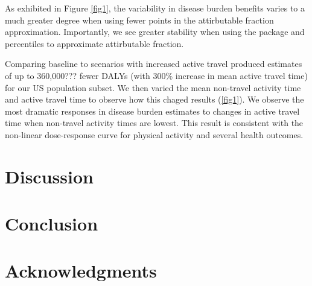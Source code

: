 \documentclass[10pt,letterpaper]{article}\usepackage[]{graphicx}\usepackage[]{color}
\begin{document}
As exhibited in Figure \ref{fig1}, the variability in disease burden
benefits varies to a much greater degree when using fewer points in
the attirbutable fraction approximation. Importantly, we see greater
stability when using the package and percentiles to approximate
attirbutable fraction.

Comparing baseline to scenarios with increased active travel produced
estimates of up to 360,000??? fewer DALYs (with 300\% increase in mean
active travel time) for our US population subset. We then varied the
mean non-travel activity time and active travel time to observe how
this chaged results (\ref{fig1}). We observe the most dramatic
responses in disease burden estimates to changes in active travel time
when non-travel activity times are lowest. This result is consistent
with the non-linear dose-response curve for physical activity and
several health outcomes.

%

\section*{Discussion}
%

\section*{Conclusion}
%


%

\section*{Acknowledgments}

\nolinenumbers


\end{document}
